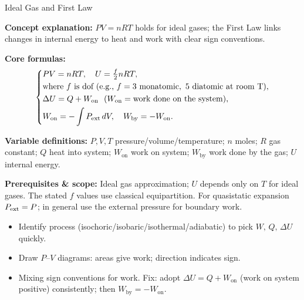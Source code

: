 \begin{KnowledgePoint}{Ideal Gas and First Law \Core}
  \KPFormulas
  \begin{formulabox}
  \textbf{Concept explanation:} $PV=nRT$ holds for ideal gases; the First Law links changes in internal energy to heat and work with clear sign conventions.

  \textbf{Core formulas:}
  \[
  \left\{\begin{aligned}
      &PV=nRT,\quad U=\tfrac{f}{2}nRT,\\
      &\text{where } f\ \text{is dof (e.g., }f=3\ \text{monatomic},\ 5\ \text{diatomic at room T)},\\
    &\Delta U=Q+W_{\text{on}}\ \ (W_{\text{on}}=\text{work done on the system}),\\
    &W_{\text{on}}=-\int P_{\rm ext}\,dV,\quad W_{\text{by}}=-W_{\text{on}}.
  \end{aligned}\right.
  \]

  \textbf{Variable definitions:} $P,V,T$ pressure/volume/temperature; $n$ moles; $R$ gas constant; $Q$ heat into system; $W_{\text{on}}$ work on system; $W_{\text{by}}$ work done by the gas; $U$ internal energy.

  

  \textbf{Prerequisites \& scope:} Ideal gas approximation; $U$ depends only on $T$ for ideal gases. The stated $f$ values use classical equipartition. For quasistatic expansion $P_{\rm ext}=P$; in general use the external pressure for boundary work.
  \end{formulabox}

  \KPHeuristics
  \begin{heuristicsbox}
  \begin{itemize}[leftmargin=*]
    \item Identify process (isochoric/isobaric/isothermal/adiabatic) to pick $W,\,Q,\,\Delta U$ quickly.
    \item Draw $P$–$V$ diagrams: areas give work; direction indicates sign.
  \end{itemize}
  \vspace{0.4em}
  \begin{itemize}[leftmargin=*]
    \item Mixing sign conventions for work. Fix: adopt $\Delta U=Q+W_{\text{on}}$ (work on system positive) consistently; then $W_{\text{by}}=-W_{\text{on}}$.
  \end{itemize}
  \end{heuristicsbox}


\end{KnowledgePoint}
